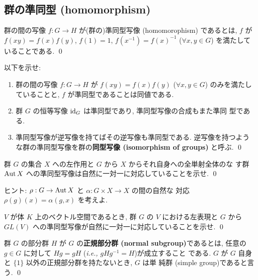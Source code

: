 \documentclass[12pt,twoside]{jarticle}
\def\Aut{\mathop{\text{\rm Aut}}\nolimits}
\def\id{\text{\rm id}}
\begin{document}

\subsection{群の準同型 (homomorphism)}
\label{ss:homomorphism}

\begin{Definition}
  群の間の写像 $f:G\to H$ が(群の)準同型写像 (homomorophism) であるとは, 
  $f$ が $f(xy) = f(x)f(y)$, $f(1)=1$, $f(x^{-1})=f(x)^{-1}$
  ($\forall x,y\in G$) を満たしていることである.
  \qed
\end{Definition}

\begin{question}[群の準同型写像]
  以下を示せ:
  \begin{enumerate}
  \item 群の間の写像 $f:G\to H$ が $f(xy) = f(x)f(y)$ ($\forall x,y\in G$) 
    のみを満たしていることと, $f$ が準同型であることは同値である.
  \item 群 $G$ の恒等写像 $\id_G$ は準同型であり, 準同型写像の合成もまた準同
    型である.
  \item 準同型写像が逆写像を持てばその逆写像も準同型である. 逆写像を持つよう
    な群の準同型写像を群の{\bf 同型写像 (isomorphism of groups)} と呼ぶ.
  \qed
  \end{enumerate}
\end{question}

\begin{question}
  群 $G$ の集合 $X$ への左作用と $G$ から $X$ からそれ自身への全単射全体のな
  す群 $\Aut X$ への準同型写像は自然に一対一に対応していることを示せ.
  \qed
\end{question}

\noindent ヒント: $\rho:G\to\Aut X$ と $\alpha:G\times X\to X$ の間の自然な
対応 $\rho(g)(x) = \alpha(g,x)$ を考えよ.

\begin{question}
  $V$ が体 $K$ 上のベクトル空間であるとき, 群 $G$ の $V$ における左表現と
  $G$ から $GL(V)$ への準同型写像が自然に一対一に対応していることを示せ.
  \qed
\end{question}

\begin{Definition}
  群 $G$ の部分群 $H$ が $G$ の{\bf 正規部分群 (normal subgroup)}であるとは,
  任意の $g\in G$ に対して $Hg=gH$ ({\it i.e., $gHg^{-1}=H$})が成立すること
  である. $G$ が $G$ 自身と $\{1\}$ 以外の正規部分群を持たないとき, $G$ は単
  純群 (simple group)であると言う.
  \qed
\end{Definition}
\end{document}
